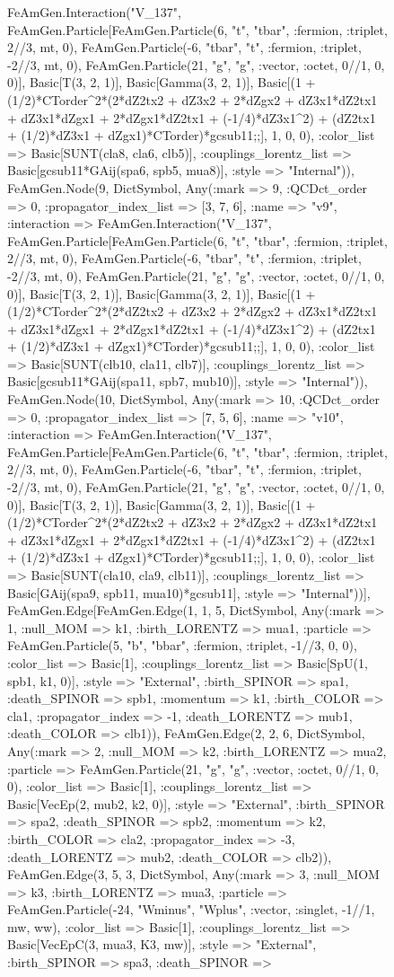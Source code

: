 \documentclass{revtex4}
\begin{document}
\begin{figure}[!htb]
\begin{center}
{FeAmGen.Interaction("V_137", FeAmGen.Particle[FeAmGen.Particle(6, "t", "tbar", :fermion, :triplet, 2//3, mt, 0), FeAmGen.Particle(-6, "tbar", "t", :fermion, :triplet, -2//3, mt, 0), FeAmGen.Particle(21, "g", "g", :vector, :octet, 0//1, 0, 0)], Basic[T(3, 2, 1)], Basic[Gamma(3, 2, 1)], Basic[(1 + (1/2)*CTorder^2*(2*dZ2tx2 + dZ3x2 + 2*dZgx2 + dZ3x1*dZ2tx1 + dZ3x1*dZgx1 + 2*dZgx1*dZ2tx1 + (-1/4)*dZ3x1^2) + (dZ2tx1 + (1/2)*dZ3x1 + dZgx1)*CTorder)*gcsub11;;], 1, 0, 0), :color_list => Basic[SUNT(cla8, cla6, clb5)], :couplings_lorentz_list => Basic[gcsub11*GAij(spa6, spb5, mua8)], :style => "Internal")), FeAmGen.Node(9, Dict{Symbol, Any}(:mark => 9, :QCDct_order => 0, :propagator_index_list => [3, 7, 6], :name => "v9", :interaction => FeAmGen.Interaction("V_137", FeAmGen.Particle[FeAmGen.Particle(6, "t", "tbar", :fermion, :triplet, 2//3, mt, 0), FeAmGen.Particle(-6, "tbar", "t", :fermion, :triplet, -2//3, mt, 0), FeAmGen.Particle(21, "g", "g", :vector, :octet, 0//1, 0, 0)], Basic[T(3, 2, 1)], Basic[Gamma(3, 2, 1)], Basic[(1 + (1/2)*CTorder^2*(2*dZ2tx2 + dZ3x2 + 2*dZgx2 + dZ3x1*dZ2tx1 + dZ3x1*dZgx1 + 2*dZgx1*dZ2tx1 + (-1/4)*dZ3x1^2) + (dZ2tx1 + (1/2)*dZ3x1 + dZgx1)*CTorder)*gcsub11;;], 1, 0, 0), :color_list => Basic[SUNT(clb10, cla11, clb7)], :couplings_lorentz_list => Basic[gcsub11*GAij(spa11, spb7, mub10)], :style => "Internal")), FeAmGen.Node(10, Dict{Symbol, Any}(:mark => 10, :QCDct_order => 0, :propagator_index_list => [7, 5, 6], :name => "v10", :interaction => FeAmGen.Interaction("V_137", FeAmGen.Particle[FeAmGen.Particle(6, "t", "tbar", :fermion, :triplet, 2//3, mt, 0), FeAmGen.Particle(-6, "tbar", "t", :fermion, :triplet, -2//3, mt, 0), FeAmGen.Particle(21, "g", "g", :vector, :octet, 0//1, 0, 0)], Basic[T(3, 2, 1)], Basic[Gamma(3, 2, 1)], Basic[(1 + (1/2)*CTorder^2*(2*dZ2tx2 + dZ3x2 + 2*dZgx2 + dZ3x1*dZ2tx1 + dZ3x1*dZgx1 + 2*dZgx1*dZ2tx1 + (-1/4)*dZ3x1^2) + (dZ2tx1 + (1/2)*dZ3x1 + dZgx1)*CTorder)*gcsub11;;], 1, 0, 0), :color_list => Basic[SUNT(cla10, cla9, clb11)], :couplings_lorentz_list => Basic[GAij(spa9, spb11, mua10)*gcsub11], :style => "Internal"))], FeAmGen.Edge[FeAmGen.Edge(1, 1, 5, Dict{Symbol, Any}(:mark => 1, :null_MOM => k1, :birth_LORENTZ => mua1, :particle => FeAmGen.Particle(5, "b", "bbar", :fermion, :triplet, -1//3, 0, 0), :color_list => Basic[1], :couplings_lorentz_list => Basic[SpU(1, spb1, k1, 0)], :style => "External", :birth_SPINOR => spa1, :death_SPINOR => spb1, :momentum => k1, :birth_COLOR => cla1, :propagator_index => -1, :death_LORENTZ => mub1, :death_COLOR => clb1)), FeAmGen.Edge(2, 2, 6, Dict{Symbol, Any}(:mark => 2, :null_MOM => k2, :birth_LORENTZ => mua2, :particle => FeAmGen.Particle(21, "g", "g", :vector, :octet, 0//1, 0, 0), :color_list => Basic[1], :couplings_lorentz_list => Basic[VecEp(2, mub2, k2, 0)], :style => "External", :birth_SPINOR => spa2, :death_SPINOR => spb2, :momentum => k2, :birth_COLOR => cla2, :propagator_index => -3, :death_LORENTZ => mub2, :death_COLOR => clb2)), FeAmGen.Edge(3, 5, 3, Dict{Symbol, Any}(:mark => 3, :null_MOM => k3, :birth_LORENTZ => mua3, :particle => FeAmGen.Particle(-24, "Wminus", "Wplus", :vector, :singlet, -1//1, mw, ww), :color_list => Basic[1], :couplings_lorentz_list => Basic[VecEpC(3, mua3, K3, mw)], :style => "External", :birth_SPINOR => spa3, :death_SPINOR => }
\end{center}
\end{figure}
\end{document}
